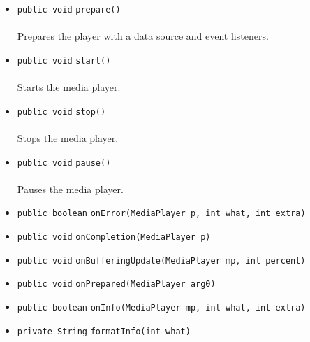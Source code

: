 \begin{itemize}
\item \lstinline|public void| \lstinline|prepare|\lstinline|()|\\ \\[-0.6em]
Prepares the player with a data source and event listeners.



\item \lstinline|public void| \lstinline|start|\lstinline|()|\\ \\[-0.6em]
Starts the media player.



\item \lstinline|public void| \lstinline|stop|\lstinline|()|\\ \\[-0.6em]
Stops the media player.



\item \lstinline|public void| \lstinline|pause|\lstinline|()|\\ \\[-0.6em]
Pauses the media player.



\item \lstinline|public boolean| \lstinline|onError|\lstinline|(MediaPlayer p, int what, int extra)| \\[-0.6em]




\item \lstinline|public void| \lstinline|onCompletion|\lstinline|(MediaPlayer p)| \\[-0.6em]




\item \lstinline|public void| \lstinline|onBufferingUpdate|\lstinline|(MediaPlayer mp, int percent)| \\[-0.6em]




\item \lstinline|public void| \lstinline|onPrepared|\lstinline|(MediaPlayer arg0)| \\[-0.6em]




\item \lstinline|public boolean| \lstinline|onInfo|\lstinline|(MediaPlayer mp, int what, int extra)| \\[-0.6em]




\item \lstinline|private String| \lstinline|formatInfo|\lstinline|(int what)| \\[-0.6em]





\end{itemize}
